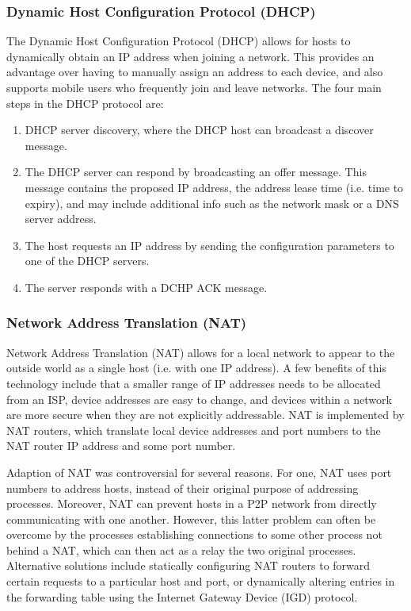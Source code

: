 \documentclass[12pt,titlepage]{article}
\begin{document}
      \subsubsection{Dynamic Host Configuration Protocol (DHCP)}
        The Dynamic Host Configuration Protocol (DHCP) allows for hosts to dynamically obtain an IP address when joining a network. This provides an
        advantage over having to manually assign an address to each device, and also supports mobile users who frequently join and leave networks.
        The four main steps in the DHCP protocol are:
        \begin{enumerate}
          \item DHCP server discovery, where the DHCP host can broadcast a discover message.
          \item The DHCP server can respond by broadcasting an offer message. This message contains the proposed IP address, the address lease time
          (i.e. time to expiry), and may include additional info such as the network mask or a DNS server address.
          \item The host requests an IP address by sending the configuration parameters to one of the DHCP servers.
          \item The server responds with a DCHP ACK message.
        \end{enumerate}

      \subsubsection{Network Address Translation (NAT)}
        Network Address Translation (NAT) allows for a local network to appear to the outside world as a single host (i.e. with one IP address).
        A few benefits of this technology include that a smaller range of IP addresses needs to be allocated from an ISP, device addresses are easy
        to change, and devices within a network are more secure when they are not explicitly addressable. NAT is implemented by NAT routers, which
        translate local device addresses and port numbers to the NAT router IP address and some port number.

        Adaption of NAT was controversial for several reasons. For one, NAT uses port numbers to address hosts, instead of their original purpose of
        addressing processes. Moreover, NAT can prevent hosts in a P2P network from directly communicating with one another. However, this latter
        problem can often be overcome by the processes establishing connections to some other process not behind a NAT, which can then act as a relay
        the two original processes. Alternative solutions include statically configuring NAT routers to forward certain requests to a particular host
        and port, or dynamically altering entries in the forwarding table using the Internet Gateway Device (IGD) protocol.
\end{document}
